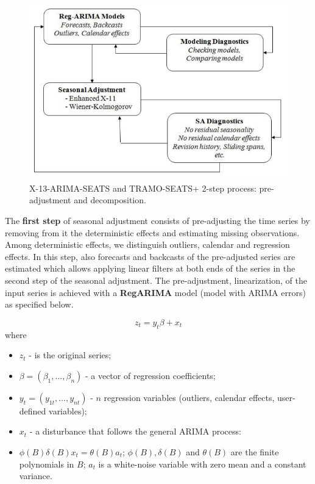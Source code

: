 \documentclass[article]{jss}
\providecommand{\tightlist}{%
  \setlength{\itemsep}{0pt}\setlength{\parskip}{0pt}}
\begin{document}
\begin{figure}[htb]
\centering
\includegraphics[scale=0.8]{img/sa_2_steps.PNG} 
\caption{X-13-ARIMA-SEATS and TRAMO-SEATS+ 2-step process: pre-adjustment and decomposition.}
\label{fig:2_step_proc}
\end{figure}

The \textbf{first step} of seasonal adjustment consists of pre-adjusting
the time series by removing from it the deterministic effects and
estimating missing observations. Among deterministic effects, we
distinguish outliers, calendar and regression effects. In this step,
also forecasts and backcasts of the pre-adjusted series are estimated
which allows applying linear filters at both ends of the series in the
second step of the seasonal adjustment. The pre-adjustment,
linearization, of the input series is achieved with a \textbf{RegARIMA}
model (model with ARIMA errors) as specified below.

\[z_t=y_t\beta+x_t\] where

\begin{itemize}
\tightlist
\item
  \(z_t\) - is the original series;
\item
  \(\beta = (\beta_1,...,\beta_n)\) - a vector of regression
  coefficients;
\item
  \(y_t = (y_{1t},...,y_{nt})\) - \(n\) regression variables (outliers,
  calendar effects, user-defined variables);
\item
  \(x_t\) - a disturbance that follows the general ARIMA process:
\item
  \(\phi(B)\delta(B)x_t=\theta(B)a_t\); \(\phi(B), \delta(B)\) and
  \(\theta(B)\) are the finite polynomials in \(B\); \(a_t\) is a
  white-noise variable with zero mean and a constant variance.
\end{itemize}
\end{document}
